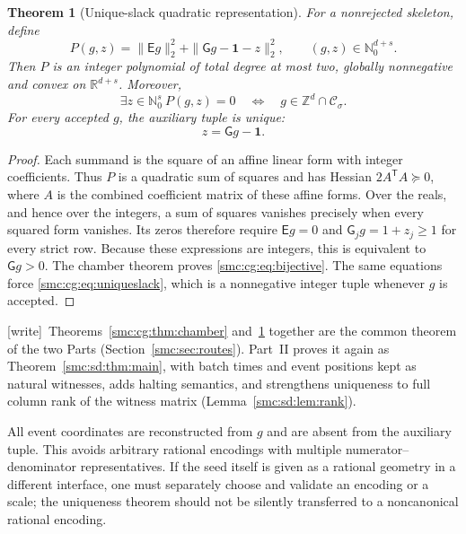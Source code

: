 \documentclass[11pt,letterpaper]{article}
\numberwithin{equation}{section}
\newtheorem{theorem}{Theorem}[section]
\theoremstyle{definition}
\theoremstyle{remark}
\newcommand{\N}{\mathbb N_0}
\newcommand{\Z}{\mathbb Z}
\newcommand{\R}{\mathbb R}
\newcommand{\Ccal}{\mathcal C}
\newcommand{\wtag}{\textup{[write]}}
\begin{document}
\begin{theorem}[Unique-slack quadratic representation]
\label{smc:cg:thm:quadratic}
For a nonrejected skeleton, define
\begin{equation}
 P(g,z)=\|\mathsf E g\|_2^2+
        \|\mathsf Gg-\mathbf1-z\|_2^2,
 \qquad (g,z)\in\N^{d+s}.
 \label{smc:cg:eq:P}
\end{equation}
Then $P$ is an integer polynomial of total degree at most two, globally
nonnegative and convex on $\R^{d+s}$. Moreover,
\begin{equation}
 \exists z\in\N^s\ P(g,z)=0
 \quad\Longleftrightarrow\quad
 g\in\Z^d\cap\Ccal_\sigma.
 \label{smc:cg:eq:bijective}
\end{equation}
For every accepted $g$, the auxiliary tuple is unique:
\begin{equation}
 z=\mathsf Gg-\mathbf1.
 \label{smc:cg:eq:uniqueslack}
\end{equation}
\end{theorem}
\begin{proof}
Each summand is the square of an affine linear form with integer
coefficients. Thus $P$ is a quadratic sum of squares and has Hessian
$2A^{\mathsf T}A\succeq0$, where $A$ is the combined coefficient matrix of
these affine forms. Over the reals, and hence over the integers, a sum of
squares vanishes precisely when every squared form vanishes. Its zeros
therefore require $\mathsf E g=0$ and
$\mathsf G_jg=1+z_j\ge1$ for every strict row. Because these expressions are
integers, this is equivalent to $\mathsf Gg>0$. The chamber theorem proves
\eqref{smc:cg:eq:bijective}. The same equations force \eqref{smc:cg:eq:uniqueslack}, which
is a nonnegative integer tuple whenever $g$ is accepted.
\end{proof}

\wtag\ Theorems~\ref{smc:cg:thm:chamber} and~\ref{smc:cg:thm:quadratic} together are the common theorem of the two Parts (Section~\ref{smc:sec:routes}). Part~II proves it again as Theorem~\ref{smc:sd:thm:main}, with batch times and event positions kept as natural witnesses, adds halting semantics, and strengthens uniqueness to full column rank of the witness matrix (Lemma~\ref{smc:sd:lem:rank}).

All event coordinates are reconstructed from $g$ and are absent from the
auxiliary tuple. This avoids arbitrary rational encodings with multiple
numerator--denominator representatives. If the seed itself is given as a
rational geometry in a different interface, one must separately choose and
validate an encoding or a scale; the uniqueness theorem should not be
silently transferred to a noncanonical rational encoding.
\end{document}
